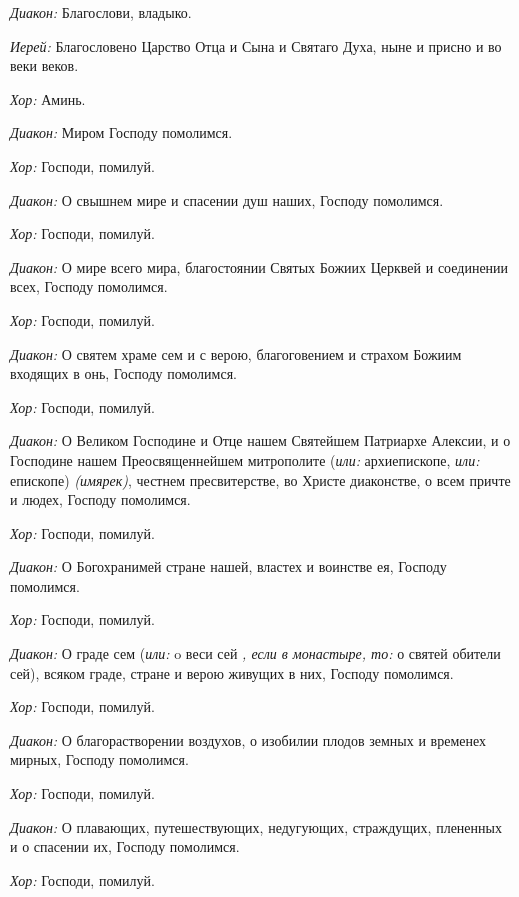 \begin{mymulticols}

{\itshape Диакон:} Благослови, владыко.

{\itshape Иерей:} Благословено Царство Отца и Сына и Святаго Духа, ныне и присно и во веки веков. 


{\itshape Хор:} Аминь.




{\itshape Диакон:} Миром Господу помолимся. 


{\itshape Хор:} Господи, помилуй.

{\itshape Диакон:} О свышнем мире и спасении душ наших, Господу помолимся. 

{\itshape Хор:} Господи, помилуй.

{\itshape Диакон:} О мире всего мира, благостоянии Святых Божиих Церквей и соединении всех, Господу помолимся.

{\itshape Хор:} Господи, помилуй.

{\itshape Диакон:} О святем храме сем и с верою, благоговением и страхом Божиим входящих в онь, Господу помолимся. 

{\itshape Хор:} Господи, помилуй.

{\itshape Диакон:} О Великом Господине и Отце нашем Святейшем Патриархе Алексии, и о Господине нашем Преосвященнейшем митрополите ({\itshape или:} архиепископе, {\itshape или:} епископе) {\itshape (имярек)}, честнем пресвитерстве, во Христе диаконстве, о всем причте и людех, Господу помолимся. 

{\itshape Хор:} Господи, помилуй.

{\itshape Диакон:} О Богохранимей стране нашей, властех и воинстве ея, Господу помолимся.

{\itshape Хор:} Господи, помилуй.

{\itshape Диакон:} О граде сем ({\itshape или:} o веси сей {\itshape, если в монастыре, то: } о святей обители сей), всяком граде, стране и верою живущих в них, Господу помолимся. 

{\itshape Хор:} Господи, помилуй.

{\itshape Диакон:} О благорастворении воздухов, о изобилии плодов земных и временех мирных, Господу помолимся.

{\itshape Хор:} Господи, помилуй.

{\itshape Диакон:} О плавающих, путешествующих, недугующих, страждущих, плененных и о спасении их, Господу помолимся. 

{\itshape Хор:} Господи, помилуй.


\end{mymulticols}
